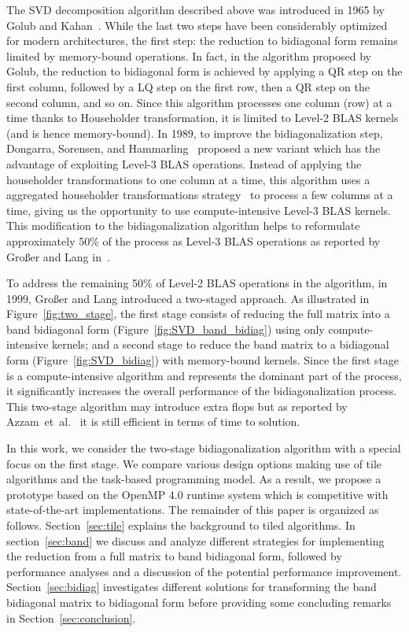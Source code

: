 The SVD decomposition algorithm described above was introduced in
1965 by Golub and Kahan~\cite{golub1965calculating}.
While the last two steps have been considerably optimized
for modern architectures,
the first step: the reduction to bidiagonal form remains limited by
memory-bound operations. In fact, in the algorithm proposed by Golub,
the reduction to bidiagonal form is achieved by applying a QR step on
the first column, followed by a LQ step on the first row, then a QR
step on the second column, and so on. Since this algorithm processes
one column (row) at a time thanks to Householder transformation, it is
limited to Level-2 BLAS kernels (and is hence memory-bound).
In 1989, to improve the bidiagonalization step,
Dongarra, Sorensen, and Hammarling~\cite{dongarra1989block}
proposed a new variant which has the advantage of exploiting
Level-3 BLAS operations.
Instead of applying the householder transformations to
one column at a time,
this algorithm uses a aggregated householder transformations
strategy~\cite{bischof1987wy} to process a few columns at a time,
giving us the opportunity to use compute-intensive Level-3 BLAS kernels.
This modification to the bidiagonalization algorithm helps
to reformulate approximately  50\% of the process as Level-3 BLAS operations
as reported by Gro{\ss}er and Lang in~\cite{grosser1999efficient}.

To address the remaining 50\% of Level-2 BLAS operations in the
algorithm, in 1999, Gro{\ss}er and Lang introduced a two-staged
approach.
As illustrated in Figure~\ref{fig:two_stage},
the first stage consists of reducing the full matrix into a
band bidiagonal form (Figure~\ref{fig:SVD_band_bidiag}) using only
compute-intensive kernels; and a second stage to reduce the band
matrix to a bidiagonal form (Figure~\ref{fig:SVD_bidiag}) with
memory-bound kernels. Since the first stage is a compute-intensive
algorithm and represents the dominant part of the process,
it significantly increases the overall performance of the
bidiagonalization process.
This two-stage algorithm may introduce extra flops
but as reported by Azzam~et~al\@.~\cite{haidar2013improved}
it is still efficient in terms of time to solution.

In this work, we consider the two-stage bidiagonalization algorithm
with a special focus on the first stage.
We compare various design options making use of tile algorithms and
the task-based programming model.
As a result,
we propose a prototype based on the OpenMP 4.0 runtime system which is
competitive with state-of-the-art implementations.
The remainder of this paper is organized as follows.
Section~\ref{sec:tile} explains the background to tiled algorithms.
In section~\ref{sec:band} we discuss and analyze
different strategies for implementing the
reduction from a full matrix to band bidiagonal form,
followed by performance analyses and a discussion of
the potential performance improvement.
Section~\ref{sec:bidiag} investigates different solutions
for transforming the band bidiagonal matrix
to bidiagonal form before providing some concluding
remarks in Section~\ref{sec:conclusion}.

